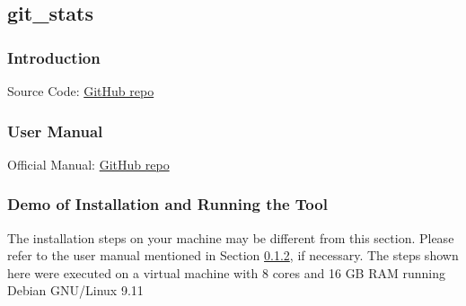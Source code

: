 \documentclass[letterpaper,cleveref]{lipics-v2019}
\begin{document}
\subsection{git\_stats}

\subsubsection{Introduction}

Source Code: \href{https://github.com/tomgi/git_stats}{GitHub repo}

\subsubsection{User Manual} \label{git_stats_manual}

Official Manual: \href{https://github.com/tomgi/git_stats}{GitHub repo}

\subsubsection{Demo of Installation and Running the Tool}

The installation steps on your machine may be different from this section.
Please refer to the user manual mentioned in Section \ref{git_stats_manual}, if
necessary.  The steps shown here were executed on a virtual machine with 8 cores
and 16 GB RAM running Debian GNU/Linux 9.11
\end{document}
